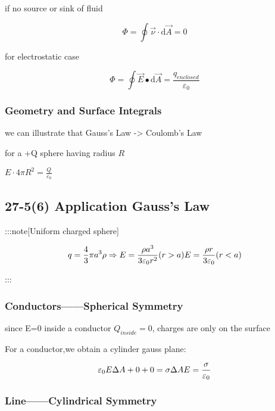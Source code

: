 \documentclass[
]{article}
\begin{document}
if no source or sink of fluid

\[
\Phi=\oint \vec \nu \cdot \mathrm d\vec A=0
\]

for electrostatic case

\[
\Phi=\oint\vec{E}\bullet \mathrm d\vec{A}=\frac{q_{enclosed}}{\varepsilon _0}
\]

\hypertarget{geometry-and-surface-integrals}{%
\subsubsection{Geometry and Surface
Integrals}\label{geometry-and-surface-integrals}}

we can illustrate that Gauss's Law -\textgreater{} Coulomb's Law

for a +Q sphere having radius \(R\)

\(E \cdot 4\pi R^2=\frac{Q}{\varepsilon _0}\)

\hypertarget{application-gausss-law}{%
\subsection{27-5(6) Application Gauss's
Law}\label{application-gausss-law}}

:::note{[}Uniform charged sphere{]}

\[
q=\frac{4}{3}\pi  a^3\rho\Rightarrow E=\frac{\rho a^3}{3\varepsilon _0r^2}(r>a)\\E=\frac{\rho r}{3\varepsilon _0}(r<a)
\]

:::

\hypertarget{conductorsspherical-symmetry}{%
\subsubsection{Conductors------Spherical
Symmetry}\label{conductorsspherical-symmetry}}

since E=0 inside a conductor \(Q_{inside}=0\), charges are only on the
surface

For a conductor,we obtain a cylinder gauss plane:

\[
\varepsilon_0E\Delta A+0+0=\sigma \Delta A\\E=\frac{\sigma}{\varepsilon _0}
\]

\hypertarget{linecylindrical-symmetry}{%
\subsubsection{Line------Cylindrical
Symmetry}\label{linecylindrical-symmetry}}
\end{document}
